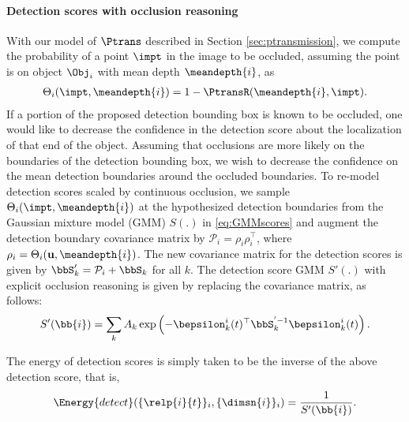 \paragraph{Detection scores with occlusion reasoning} 
With our model of $\Ptrans$ described in Section \ref{sec:ptransmission}, we 
compute the probability of a point $\impt$ in the image to be occluded, assuming
the point is on object $\Obj_i$ with mean depth $\meandepth{i}$, as
\begin{align}
  \Theta_{i}(\impt, \meandepth{i}) = 1 - \PtransR(\meandepth{i}, \impt).
\end{align}
If a portion of the proposed detection bounding box is known to be 
occluded, one would like to decrease the confidence in the detection score 
about the localization of that end of the object. Assuming that occlusions 
are more likely on the boundaries of the detection bounding box, we wish to decrease the 
confidence on the mean detection boundaries around the occluded boundaries.
To re-model detection scores scaled by continuous occlusion, we sample
$\Theta_{i}(\impt, \meandepth{i})$ at the hypothesized detection boundaries from
the Gaussian mixture model (GMM) $S(.)$ in \eqref{eq:GMMscores} and augment the detection boundary covariance matrix by
$\mathcal{P}_{i} = \rho_{i}\rho_{i}^\top$, where $\rho_{i} = \Theta_{i}(\mathbf{u},
\meandepth{i})$. The new covariance matrix for the detection scores is given by 
  $\bbS'_k = \mathcal{P}_{i} + \bbS_k$ for all $k$.
The detection score GMM $S'(.)$ with explicit occlusion reasoning is given by replacing the covariance
matrix, as follows:
%
\begin{align}
S'(\bb{i}) = \sum_k A_k \exp \left( -\bepsilon_k^{i}(t)^\top \bbS_k^{'-1} \bepsilon_k^{i}(t) \right).
\end{align}

The energy of detection scores is simply taken to be the inverse of the above detection score, that is,
\begin{align}
  \Energy{detect}(\{ \relp{i}{t} \}_i, \{\dimsn{i}\}_i ) = \frac{1}{S'(\bb{i})}.
\end{align}

